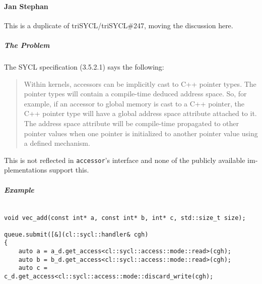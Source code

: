 \begin{otherlanguage}{english}
    \paragraph{Jan Stephan} This is a duplicate of triSYCL/triSYCL\#247, moving
                            the discussion here.
                            \subparagraph{The Problem} The SYCL specification
                            (3.5.2.1) says the following:
                            \begin{quote}
                                Within kernels, accessors can be implicitly cast
                                to C++ pointer types. The pointer types will
                                contain a compile-time deduced address space.
                                So, for example, if an accessor to global memory
                                is cast to a C++ pointer, the C++ pointer type
                                will have a global address space attribute
                                attached to it. The address space attribute will
                                be compile-time propagated to other pointer
                                values when one pointer is initialized to
                                another pointer value using a defined mechanism.
                            \end{quote}
                            This is not reflected in \texttt{accessor}'s
                            interface and none of the publicly available
                            implementations support this.
                            \subparagraph{Example} $~$ \\
                            \begin{code}
                                \begin{verbatim}
void vec_add(const int* a, const int* b, int* c, std::size_t size);

queue.submit([&](cl::sycl::handler& cgh)
{
    auto a = a_d.get_access<cl::sycl::access::mode::read>(cgh);
    auto b = b_d.get_access<cl::sycl::access::mode::read>(cgh);
    auto c = c_d.get_access<cl::sycl::access::mode::discard_write(cgh);


\end{verbatim}
\end{code}
\end{otherlanguage}
